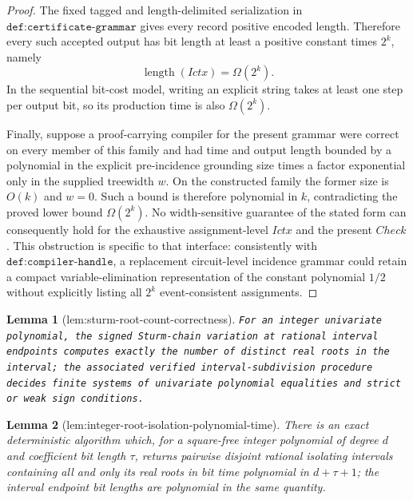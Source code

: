 \documentclass{article}
\newtheorem{lemma}{Lemma}
\begin{document}
\begin{proof}
The fixed tagged and length-delimited serialization in \(\texttt{def:certificate-grammar}\) gives every record positive encoded length.  Therefore every such accepted output has bit length at least a positive constant times \(2^k\), namely
\[
\operatorname{length}(Ictx)=\Omega(2^k).
\]
In the sequential bit-cost model, writing an explicit string takes at least one step per output bit, so its production time is also \(\Omega(2^k)\).

Finally, suppose a proof-carrying compiler for the present grammar were correct on every member of this family and had time and output length bounded by a polynomial in the explicit pre-incidence grounding size times a factor exponential only in the supplied treewidth \(w\).  On the constructed family the former size is \(O(k)\) and \(w=0\).  Such a bound is therefore polynomial in \(k\), contradicting the proved lower bound \(\Omega(2^k)\).  No width-sensitive guarantee of the stated form can consequently hold for the exhaustive assignment-level \(Ictx\) and the present \(Check\).  This obstruction is specific to that interface: consistently with \(\texttt{def:compiler-handle}\), a replacement circuit-level incidence grammar could retain a compact variable-elimination representation of the constant polynomial \(1/2\) without explicitly listing all \(2^k\) event-consistent assignments.
\end{proof}

\begin{lemma}[lem:sturm-root-count-correctness]\label{lem:sturm-root-count-correctness}
\texttt{For an integer univariate polynomial,\allowbreak{} the signed Sturm-\allowbreak{}chain variation at rational interval endpoints computes exactly the number of distinct real roots in the interval;\allowbreak{} the associated verified interval-\allowbreak{}subdivision procedure decides finite systems of univariate polynomial equalities and strict or weak sign conditions.}
\end{lemma}

\begin{lemma}[lem:integer-root-isolation-polynomial-time]\label{lem:integer-root-isolation-polynomial-time}
There is an exact deterministic algorithm which, for a square-free integer polynomial of degree \(d\) and coefficient bit length \(\tau\), returns pairwise disjoint rational isolating intervals containing all and only its real roots in bit time polynomial in \(d+\tau+1\); the interval endpoint bit lengths are polynomial in the same quantity.
\end{lemma}
\end{document}
